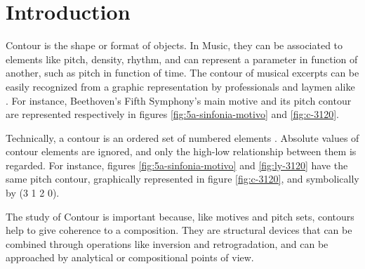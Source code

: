 

\section{Introduction}
\label{sec:introduction}
Contour is the shape or format of objects. In Music, they can be
associated to elements like pitch, density, rhythm, and can represent
a parameter in function of another, such as pitch in function of time.
The contour of musical excerpts can be easily recognized from a
graphic representation by professionals and laymen alike
\cite{marvin88:generalized}. For instance, Beethoven's Fifth
Symphony's main motive and its pitch contour are represented
respectively in figures \ref{fig:5a-sinfonia-motivo} and
\ref{fig:c-3120}.

Technically, a contour is an ordered set of numbered elements
\cite{morris93:directions}. Absolute values of contour elements are
ignored, and only the high-low relationship between them is
regarded. For instance, figures \ref{fig:5a-sinfonia-motivo} and
\ref{fig:ly-3120} have the same pitch contour, graphically represented
in figure \ref{fig:c-3120}, and symbolically by (3 1 2 0).

The study of Contour is important because, like motives and pitch
sets, contours help to give coherence to a composition. They are
structural devices that can be combined through operations like
inversion and retrogradation, and can be approached by analytical or
compositional points of view.

